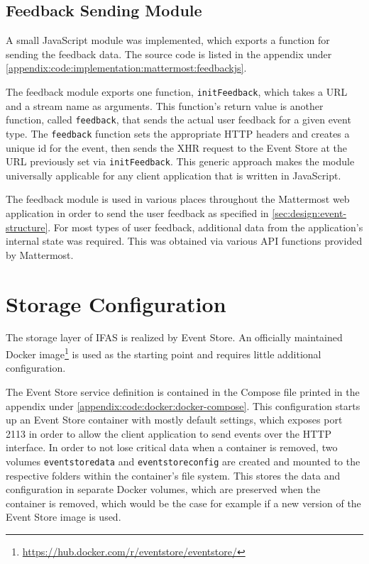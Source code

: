 \subsection{Feedback Sending Module}

A small JavaScript module was implemented, which exports a function for sending the feedback data.
The source code is listed in the appendix under \cref{appendix:code:implementation:mattermost:feedbackjs}.

The feedback module exports one function, \texttt{initFeedback}, which takes a URL and a stream name as arguments.
This function's return value is another function, called \texttt{feedback}, that sends the actual user feedback for a given event type.
The \texttt{feedback} function sets the appropriate \ac{HTTP} headers and creates a unique id for the event, then sends the \ac{XHR} request to the Event Store at the URL previously set via \texttt{initFeedback}.
This generic approach makes the module universally applicable for any client application that is written in JavaScript.

The feedback module is used in various places throughout the Mattermost web application in order to send the user feedback as specified in \cref{sec:design:event-structure}.
For most types of user feedback, additional data from the application's internal state was required.
This was obtained via various \ac{API} functions provided by Mattermost.

\section{Storage Configuration}
\label{sec:implementation:storage}

The storage layer of \ac{IFAS} is realized by Event Store.
An officially maintained Docker image\footnote{\url{https://hub.docker.com/r/eventstore/eventstore/}} is used as the starting point and requires little additional configuration.

The Event Store service definition is contained in the Compose file printed in the appendix under \cref{appendix:code:docker:docker-compose}.
This configuration starts up an Event Store container with mostly default settings, which exposes port 2113 in order to allow the client application to send events over the \ac{HTTP} interface.
In order to not lose critical data when a container is removed, two volumes \texttt{eventstoredata} and \texttt{eventstoreconfig} are created and mounted to the respective folders within the container's file system.
This stores the data and configuration in separate Docker volumes, which are preserved when the container is removed, which would be the case for example if a new version of the Event Store image is used.

